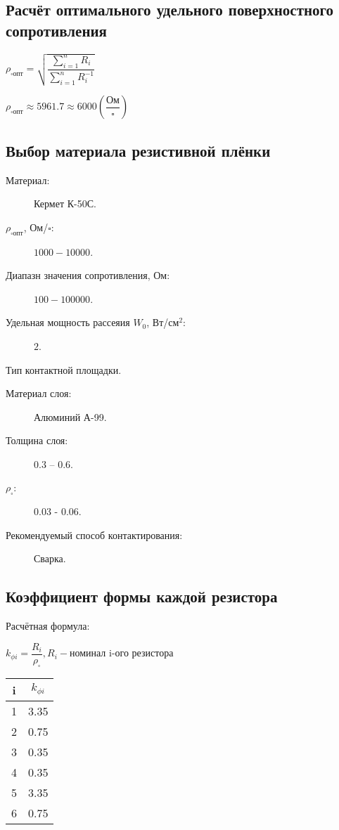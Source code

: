 \documentclass[12pt, a4paper] {ncc}
\begin{document}
	\subsection{Расчёт оптимального удельного поверхностного сопротивления}

			$\rho_{\square \text{опт}} = \sqrt { \dfrac {\sum\limits_{i = 1}^{n} R_i} {\sum\limits_{i = 1}^{n} R_i^{-1}}} $

			$\rho_{\square \text{опт}} \approx 5961.7 \approx 6000 (\dfrac {\text{Ом}} {\square})$

	\subsection{Выбор материала резистивной плёнки}

    	\begin{description}
    		\item[Материал:] Кермет К-50С.
    		\item[$\rho_{\square \text{опт}}$, Ом/$\square$:] $1000 - 10000$.
    		\item[Диапазн значения сопротивления, Ом:] $100-100000$.
    		\item[Удельная мощность рассеяия $W_0$, Вт/см$^2$:] $2$.
    	\end{description}

		Тип контактной площадки.
		\begin{description}
			\item[Материал слоя:] Алюминий А-99.
			\item[Толщина слоя:] 0.3 -- 0.6.
			\item[$\rho_{\square}$:] 0.03 - 0.06.
			\item[Рекомендуемый способ контактирования:] Сварка.
		\end{description}

	\subsection{Коэффициент формы каждой резистора}
    	 Расчётная формула:
    	\begin{center}
    		$k_{\phi i} = \dfrac {R_i} {\rho_{\square}}, R_i - \text{номинал i-ого резистора}$ \\
    	\end{center}

    	\begin{tabular}{|c|c|}
    		\hline
    		i & $k_{\phi i}$ \\ \hline
    		1 &  3.35\\ \hline
    		2 &  0.75 \\ \hline
    		3 &  0.35\\ \hline
    		4 &  0.35 \\ \hline
    		5 &  3.35 \\ \hline
    		6 &  0.75 \\ \hline
    	\end{tabular}
\end{document}
